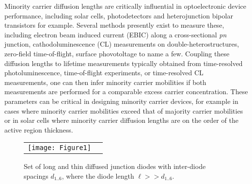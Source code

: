 \documentclass[aip,amsmath,amssymb,reprint]{revtex4-1}
\begin{document}
\maketitle
\thispagestyle{plain}

\twocolumngrid

Minority carrier diffusion lengths are critically influential in optoelectronic device performance, including solar cells, photodetectors and heterojunction bipolar transistors for example. Several methods presently exist to measure these, including electron beam induced current (EBIC) along a cross-sectional \textit{pn} junction,\cite{Maximenko} cathodoluminescence (CL) measurements on double-heterostructures,\cite{Schultes, Gustafsson, Niemeyer} zero-field time-of-flight\cite{Sharma,Lovejoy}, surface phovotoltage\cite{Scroder, Kronik} to name a few. Coupling these diffusion lengths to lifetime measurements typically obtained from time-resolved photoluminescence, time-of-flight experiments, or time-resolved CL measurements,\cite{Boulou} one can then infer minority carrier mobilities if both measurements are performed for a comparable excess carrier concentration. These parameters can be critical in designing minority carrier devices, for example in cases where minority carrier mobilities exceed that of majority carrier mobilities\cite{Lovejoy} or in solar cells where minority carrier diffusion lengths are on the order of the active region thickness.\cite{Walkera}
%
   \begin{figure} [b]
   \begin{center}
   \begin{tabular}{cc} %
   \texttt{[image: Figure1]}
   \end{tabular}
   \end{center}
   \caption[example]
   { \label{fig:fig-1}
 Set of long and thin diffused junction diodes with inter-diode spacings $d_{1..6}$, where the
diode length $\ell >> d_{1..6}$.}
   \end{figure}
\end{document}
